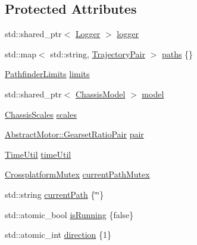 \subsection*{Protected Attributes}
\begin{DoxyCompactItemize}
\item 
std\+::shared\+\_\+ptr$<$ \mbox{\hyperlink{classokapi_1_1Logger}{Logger}} $>$ \mbox{\hyperlink{classokapi_1_1AsyncMotionProfileController_a3ee7290ff00e7e10f381a9d166f5e5f9}{logger}}
\item 
std\+::map$<$ std\+::string, \mbox{\hyperlink{structokapi_1_1AsyncMotionProfileController_1_1TrajectoryPair}{Trajectory\+Pair}} $>$ \mbox{\hyperlink{classokapi_1_1AsyncMotionProfileController_a2aa4ab02d2ef7cf29d6e6a952b3c4d9e}{paths}} \{\}
\item 
\mbox{\hyperlink{structokapi_1_1PathfinderLimits}{Pathfinder\+Limits}} \mbox{\hyperlink{classokapi_1_1AsyncMotionProfileController_a2278da257c608adfcf52b0e3b1b7802b}{limits}}
\item 
std\+::shared\+\_\+ptr$<$ \mbox{\hyperlink{classokapi_1_1ChassisModel}{Chassis\+Model}} $>$ \mbox{\hyperlink{classokapi_1_1AsyncMotionProfileController_afee259f3912a0d57620f9fd422b880c3}{model}}
\item 
\mbox{\hyperlink{classokapi_1_1ChassisScales}{Chassis\+Scales}} \mbox{\hyperlink{classokapi_1_1AsyncMotionProfileController_aad6f433eebbc0f7dff98cd3f258981a4}{scales}}
\item 
\mbox{\hyperlink{structokapi_1_1AbstractMotor_1_1GearsetRatioPair}{Abstract\+Motor\+::\+Gearset\+Ratio\+Pair}} \mbox{\hyperlink{classokapi_1_1AsyncMotionProfileController_a89073eb9854629c18558842f14af5cf0}{pair}}
\item 
\mbox{\hyperlink{classokapi_1_1TimeUtil}{Time\+Util}} \mbox{\hyperlink{classokapi_1_1AsyncMotionProfileController_a82610b4101b963cbd314e6c287be4ec4}{time\+Util}}
\item 
\mbox{\hyperlink{classCrossplatformMutex}{Crossplatform\+Mutex}} \mbox{\hyperlink{classokapi_1_1AsyncMotionProfileController_a43d16a7cf5c24e67938e25ca23d183a1}{current\+Path\+Mutex}}
\item 
std\+::string \mbox{\hyperlink{classokapi_1_1AsyncMotionProfileController_a3d2962ff85f036b10e19eb90083572be}{current\+Path}} \{\char`\"{}\char`\"{}\}
\item 
std\+::atomic\+\_\+bool \mbox{\hyperlink{classokapi_1_1AsyncMotionProfileController_a597827de59250b56093a13e39a16d02d}{is\+Running}} \{false\}
\item 
std\+::atomic\+\_\+int \mbox{\hyperlink{classokapi_1_1AsyncMotionProfileController_a7fc07f6d257d934fea7b40b18ab112cb}{direction}} \{1\}

\end{DoxyCompactItemize}

